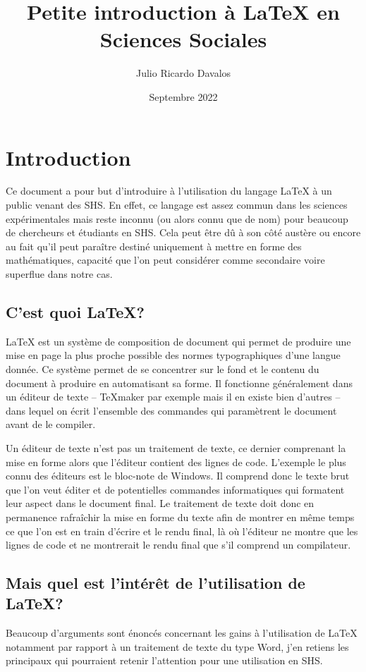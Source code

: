 \documentclass[a4paper, 11pt]{article}\usepackage[]{graphicx}\usepackage[]{xcolor}
\author{Julio Ricardo Davalos}
\title{Petite introduction à \LaTeX{} en Sciences Sociales}
\date{Septembre 2022}
\begin{document}
\maketitle

\section*{Introduction}
Ce document a pour but d'introduire à l'utilisation du langage \LaTeX{} à un public venant des SHS. En effet, ce langage est assez commun dans les sciences expérimentales mais reste inconnu (ou alors connu que de nom) pour beaucoup de chercheurs et étudiants en SHS. Cela peut être dû à son côté austère ou encore au fait qu'il peut paraître destiné uniquement à mettre en forme des mathématiques, capacité que l'on peut considérer comme secondaire voire superflue dans notre cas.

\subsection*{C'est quoi \LaTeX ?}
\LaTeX{} est un système de composition de document qui permet de produire une mise en page la plus proche possible des normes typographiques d'une langue donnée. Ce système permet de se concentrer sur le fond et le contenu du document à produire en automatisant sa forme. Il fonctionne généralement dans un éditeur de texte -- \TeX maker par exemple mais il en existe bien d'autres -- dans lequel on écrit l'ensemble des commandes qui paramètrent le document avant de le compiler. 

Un éditeur de texte n'est pas un traitement de texte, ce dernier comprenant la mise en forme alors que l'éditeur contient des lignes de code. L'exemple le plus connu des éditeurs est le bloc-note de Windows. Il comprend donc le texte brut que l'on veut éditer et de potentielles commandes informatiques qui formatent leur aspect dans le document final. Le traitement de texte doit donc en permanence rafraîchir la mise en forme du texte afin de montrer en même temps ce que l'on est en train d'écrire et le rendu final, là où l'éditeur ne montre que les lignes de code et ne montrerait le rendu final que s'il comprend un compilateur.

\subsection*{Mais quel est l'intérêt de l'utilisation de \LaTeX ?}
Beaucoup d'arguments sont énoncés concernant les gains à l'utilisation de \LaTeX{} notamment par rapport à un traitement de texte du type Word, j'en retiens les principaux qui pourraient retenir l'attention pour une utilisation en SHS.
\end{document}
